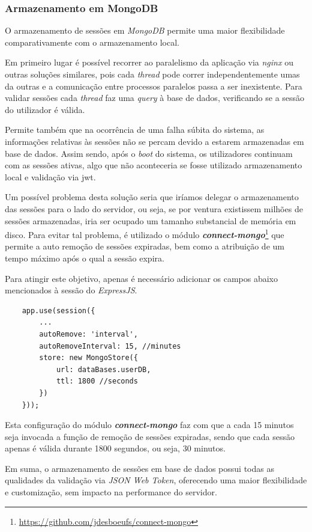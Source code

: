 \cleardoublepage
\subsubsection{Armazenamento em MongoDB} \label{armazenamentoMongo}

O armazenamento de sessões em \emph{MongoDB} permite uma maior flexibilidade comparativamente com o armazenamento local.

Em primeiro lugar é possível recorrer ao paralelismo da aplicação via \emph{nginx} ou outras soluções similares, pois cada \emph{thread} pode correr independentemente umas da outras e a comunicação entre processos paralelos passa a ser inexistente. Para validar sessões cada \emph{thread} faz uma \emph{query} à base de dados, verificando se a sessão do utilizador é válida.

Permite também que na ocorrência de uma falha súbita do sistema, as informações relativas às sessões não se percam devido a estarem armazenadas em base de dados. Assim sendo, após o \emph{boot} do sistema, os utilizadores continuam com as sessões ativas, algo que não aconteceria se fosse utilizado armazenamento local e validação via \gls{jwt}.

Um possível problema desta solução seria que iríamos delegar o armazenamento das sessões para o lado do servidor, ou seja, se por ventura existissem milhões de sessões armazenadas, iria ser ocupado um tamanho substancial de memória em disco. Para evitar tal problema, é utilizado o módulo \emph{\textbf{connect-mongo}}\footnote{\url{https://github.com/jdesboeufs/connect-mongo}} que permite a auto remoção de sessões expiradas, bem como a atribuição de um tempo máximo após o qual a sessão expira.

Para atingir este objetivo, apenas é necessário adicionar os campos abaixo mencionados à sessão do \emph{ExpressJS}.

\begin{verbatim}
    app.use(session({
        ...
        autoRemove: 'interval',
        autoRemoveInterval: 15, //minutes
        store: new MongoStore({
            url: dataBases.userDB,
            ttl: 1800 //seconds
        })
    }));
\end{verbatim}

Esta configuração do módulo \emph{\textbf{connect-mongo}} faz com que a cada 15 minutos seja invocada a função de remoção de sessões expiradas, sendo que cada sessão apenas é válida durante 1800 segundos, ou seja, 30 minutos.

Em suma, o armazenamento de sessões em base de dados possui todas as qualidades da validação via \emph{JSON Web Token}, oferecendo uma maior flexibilidade e customização, sem impacto na performance do servidor.

